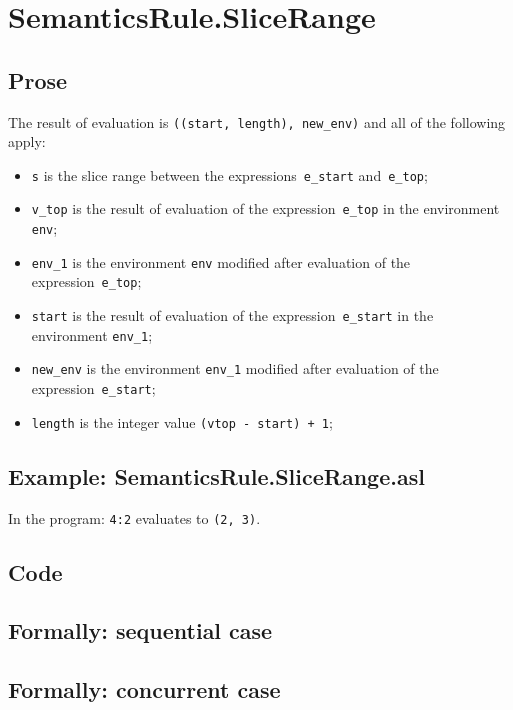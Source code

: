 \documentclass{book}
\begin{document}

\section{SemanticsRule.SliceRange \label{sec:SemanticsRule.SliceRange}}

  \subsection{Prose}
  The result of evaluation is \texttt{((start, length), new\_env)} and all of the following apply:
  \begin{itemize}
    \item \texttt{s} is the slice range between the
      expressions~\texttt{e\_start} and~\texttt{e\_top};
    \item \texttt{v\_top} is the result of evaluation of the
      expression~\texttt{e\_top} in the environment \texttt{env};
    \item \texttt{env\_1} is the environment \texttt{env} modified after
      evaluation of the expression~\texttt{e\_top};
    \item \texttt{start} is the result of evaluation of the
      expression~\texttt{e\_start} in the environment \texttt{env\_1};
    \item \texttt{new\_env} is the environment \texttt{env\_1} modified after
      evaluation of the expression~\texttt{e\_start};
    \item \texttt{length} is the integer value \texttt{(vtop - start) + 1};
  \end{itemize}

  \subsection{Example: SemanticsRule.SliceRange.asl}
  In the program:
  \texttt{4:2} evaluates to \texttt{(2, 3)}.

  \subsection{Code}

\begin{emptyformal}
  \subsection{Formally: sequential case}

  \subsection{Formally: concurrent case}
\end{emptyformal}
\end{document}

